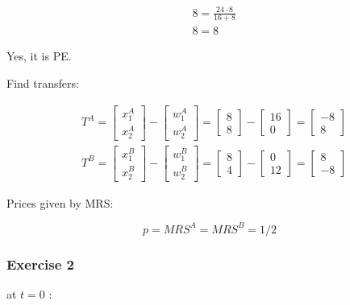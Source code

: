 {{\begin{enumerate}[label=(\roman*)]
{$$
\begin{aligned}
& 8=\frac{24 \cdot 8}{16+8} \\
& 8=8
\end{aligned}
$$

Yes, it is PE.

Find transfers:

$$
\begin{aligned}
& T^{A}=\left[\begin{array}{l}
x_{1}^{A} \\
x_{2}^{A}
\end{array}\right]-\left[\begin{array}{l}
w_{1}^{A} \\
w_{2}^{A}
\end{array}\right]=\left[\begin{array}{l}
8 \\
8
\end{array}\right]-\left[\begin{array}{l}
16 \\
0
\end{array}\right]=\left[\begin{array}{c}
-8 \\
8
\end{array}\right] \\
& T^{B}=\left[\begin{array}{l}
x_{1}^{B} \\
x_{2}^{B}
\end{array}\right]-\left[\begin{array}{l}
w_{1}^{B} \\
w_{2}^{B}
\end{array}\right]=\left[\begin{array}{l}
8 \\
4
\end{array}\right]-\left[\begin{array}{c}
0 \\
12
\end{array}\right]=\left[\begin{array}{c}
8 \\
-8
\end{array}\right]
\end{aligned}
$$

Prices given by MRS:

$$
p=M R S^{A}=M R S^{B}=1 / 2
$$
}
\end{enumerate}
}
{
\subsubsection*{Exercise 2}
\begin{enumerate}[label=(\roman*)]
{\item 
at $t=0$ :

}
\end{enumerate}}}
